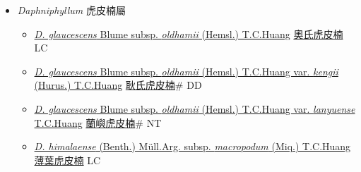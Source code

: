 
  \begin{itemize}
 \item[] \textit{Daphniphyllum} 虎皮楠屬
                    
  \begin{itemize}
        \item[] \href{http://www.theplantlist.org/tpl1.1/search?q=Daphniphyllum+glaucescens+subsp.+oldhamii}{\textit{D. glaucescens} Blume subsp. \textit{oldhamii} (Hemsl.) T.C.Huang}   \href{\detokenize{http://taibnet.sinica.edu.tw/chi/taibnet_species_list.php?T2=奧氏虎皮楠&T2_new_value=true&fr=y}}{奧氏虎皮楠} LC
        \item[] \href{http://www.theplantlist.org/tpl1.1/search?q=Daphniphyllum+glaucescens+subsp.+oldhamii+var.+kengii}{\textit{D. glaucescens} Blume subsp. \textit{oldhamii} (Hemsl.) T.C.Huang var. \textit{kengii} (Hurus.) T.C.Huang}   \href{\detokenize{http://taibnet.sinica.edu.tw/chi/taibnet_species_list.php?T2=耿氏虎皮楠&T2_new_value=true&fr=y}}{耿氏虎皮楠}\# DD
        \item[] \href{http://www.theplantlist.org/tpl1.1/search?q=Daphniphyllum+glaucescens+subsp.+oldhamii+var.+lanyuense}{\textit{D. glaucescens} Blume subsp. \textit{oldhamii} (Hemsl.) T.C.Huang var. \textit{lanyuense} T.C.Huang}   \href{\detokenize{http://taibnet.sinica.edu.tw/chi/taibnet_species_list.php?T2=蘭嶼虎皮楠&T2_new_value=true&fr=y}}{蘭嶼虎皮楠}\# NT
        \item[] \href{http://www.theplantlist.org/tpl1.1/search?q=Daphniphyllum+himalaense+subsp.+macropodum}{\textit{D. himalaense} (Benth.) Müll.Arg. subsp. \textit{macropodum} (Miq.) T.C.Huang}   \href{\detokenize{http://taibnet.sinica.edu.tw/chi/taibnet_species_list.php?T2=薄葉虎皮楠&T2_new_value=true&fr=y}}{薄葉虎皮楠} LC
  \end{itemize}
  \end{itemize}
